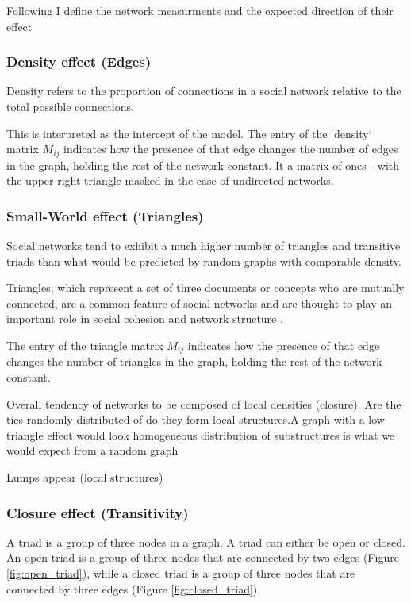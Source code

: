 

Following \citet{jiao2017} I define the network measurments and the expected direction of their effect


\subsubsection{Density effect (Edges)}

Density refers to the proportion of connections in a social network relative to the total possible connections.

This is interpreted as the intercept of the model. The entry of the `density` matrix $M_{ij}$ 
indicates how the presence of that edge changes the number of edges in the graph, holding the 
rest of the network constant. It a matrix of ones - with the upper right triangle masked in the 
case of undirected networks.

\subsubsection{Small-World effect (Triangles)}

Social networks tend to exhibit a much higher number of triangles and transitive triads than what 
would be predicted by random graphs with comparable density.

Triangles, which represent a set of three documents or concepts who are mutually connected, are a common feature of social networks and are thought to play an important role in social cohesion and network structure \citep{kossinets2006, newman2018}.

The entry of the triangle matrix $M_{ij}$ indicates how the presence of that edge changes the number of triangles in the graph, holding the rest of the network constant. 

Overall tendency of networks to be composed of local densities (closure). Are the ties randomly distributed of do they form local structures.A graph with a low triangle effect would look homogeneous distribution of substructures is what we would expect from a random graph

Lumps appear (local structures)

\subsubsection{Closure effect (Transitivity)}

A triad is a group of three nodes in a graph. A triad can either be open or closed. An open triad is a group of three nodes that are connected by two edges (Figure \ref{fig:open_triad}), while a closed triad is a group of three nodes that are connected by three edges (Figure \ref{fig:closed_triad}). 

